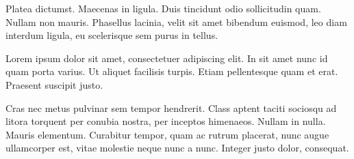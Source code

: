 Platea dictumst. Maecenas in ligula. Duis tincidunt odio sollicitudin quam.
Nullam non mauris. Phasellus lacinia, velit sit amet bibendum euismod, leo diam
interdum ligula, eu scelerisque sem purus in tellus.

Lorem ipsum dolor sit amet, consectetuer adipiscing elit. In sit amet nunc id
quam porta varius. Ut aliquet facilisis turpis. Etiam pellentesque quam et
erat. Praesent suscipit justo.

Cras nec metus pulvinar sem tempor hendrerit. Class aptent taciti sociosqu ad
litora torquent per conubia nostra, per inceptos himenaeos. Nullam in nulla.
Mauris elementum. Curabitur tempor, quam ac rutrum placerat, nunc augue
ullamcorper est, vitae molestie neque nunc a nunc. Integer justo dolor,
consequat.

